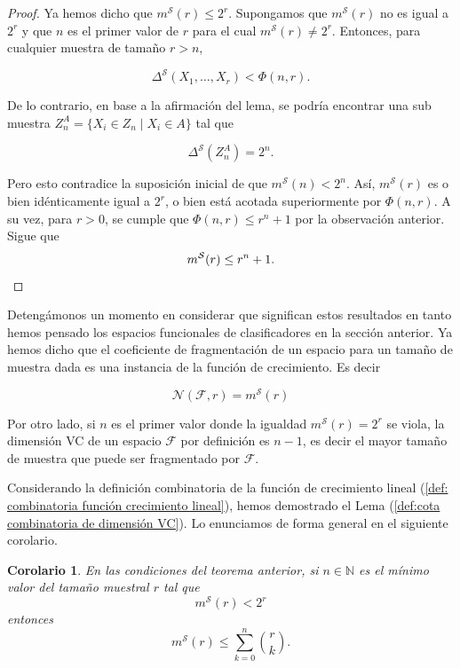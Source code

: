 \documentclass{article}
\newtheorem{cor}{Corolario}[thm]
\begin{document}
\begin{proof}
Ya hemos dicho que \( m^{\mathcal{S}}(r) \leq 2^r \). Supongamos que \( m^{\mathcal{S}}(r) \) no es 
 igual a \( 2^r \) y que \( n \) es el primer valor de \( r \) para el cual \( m^{\mathcal{S}}(r) \neq 2^r \). 
    Entonces, para cualquier muestra de tamaño \( r > n \),
    
    \[
    \Delta^{\mathcal{S}}(X_1, \dots, X_r) < \Phi(n, r).
    \]
    
    De lo contrario, en base a la afirmación del lema, se podría encontrar una sub muestra  
    \( Z_n^A = \{X_i \in Z_n \mid X_i \in A\} \) tal que  
    
    \[
    \Delta^{\mathcal{S}}\left(Z_n^A\right) = 2^n.
    \]
    
  Pero esto contradice la suposición inicial de que \( m^{\mathcal{S}}(n) < 2^n \).  
    Así, \( m^{\mathcal{S}}(r) \) es o bien idénticamente igual a \( 2^r \), o bien está acotada superiormente 
    por \( \Phi(n, r) \). A su vez, para \( r > 0 \), se cumple que \( \Phi(n, r) \leq r^n + 1 \) por la observación
    anterior. Sigue que 
    \[
        m^{\mathcal{S}}(r)   \leq r^n + 1.\newline
    \]
    
\end{proof}


Detengámonos un momento en considerar que significan estos resultados en tanto hemos pensado los espacios funcionales
de clasificadores en la sección anterior. Ya hemos dicho que el coeficiente de fragmentación de un espacio para un tamaño
de muestra dada es una instancia de la función de crecimiento. Es decir

\[
\mathcal{N}(\mathcal{F}, r) = m^{\mathcal{S}}(r)
\]

Por otro lado, si $n$ es el primer valor donde la igualdad $m^{\mathcal{S}}(r)=2^r$ se viola, la dimensión VC de un espacio $\mathcal{F}$ 
por definición es $n-1$, es decir el mayor tamaño de muestra que puede ser fragmentado por $\mathcal{F}$.\newline

Considerando la definición combinatoria de la función de crecimiento lineal (\ref{def: combinatoria función crecimiento lineal}),
hemos demostrado el Lema (\ref{def:cota combinatoria de dimensión VC}). Lo enunciamos de forma general en el siguiente corolario.

\begin{cor}
    En las condiciones del teorema anterior, si $n\in\mathbb{N}$ es el mínimo valor del tamaño muestral $r$ tal que    
    \[
        m^{\mathcal{S}}(r) < 2^r
    \]
    entonces
    \[
        m^{\mathcal{S}}(r) \leq \sum\limits_{k=0}^{n} \binom{r}{k}. 
    \]
\end{cor}
\end{document}
